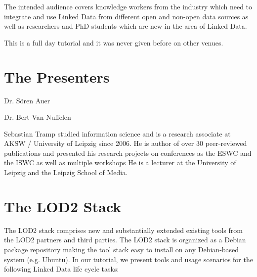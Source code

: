 \documentclass[a4paper, 11pt]{llncs}
\begin{document}
The intended audience covers knowledge workers from the industry which need to integrate and use Linked Data from different open and non-open data sources as well as researchers and PhD students which are new in the area of Linked Data.

This is a full day tutorial and it was never given before on other venues.


    

\section{The Presenters}


Dr. S\"oren Auer 

Dr. Bert Van Nuffelen 

Sebastian Tramp studied information science and is a research associate at AKSW / University of Leipzig since 2006.
He is author of over 30 peer-reviewed publications and presented his research projects on conferences as the ESWC and the ISWC as well as multiple workshops
He is a lecturer at the University of Leipzig and the Leipzig School of Media.

    
\section{The LOD2 Stack}
\label{sec:stack}

The LOD2 stack comprises new and substantially extended existing tools from the LOD2 partners and third parties.
The LOD2 stack is organized as a Debian package repository making the tool stack easy to install on any Debian-based system (e.g. Ubuntu).
In our tutorial, we present tools and usage scenarios for the following Linked Data life cycle tasks:
\end{document}
